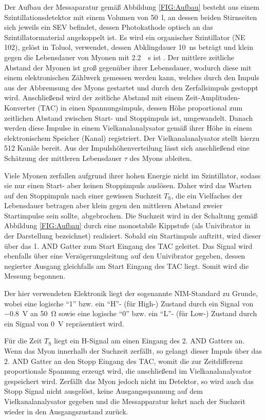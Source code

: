 Der Aufbau der Messaparatur gemäß Abbildung \ref{FIG:Aufbau} besteht aus einem Szintillationsdetektor mit einem Volumen von \SI{50}{l}, an dessen beiden Stirnseiten sich jeweils ein SEV befindet, dessen Photokathode optisch an das Szintillatormaterial angekoppelt ist. Es wird ein organischer Szintillator (NE  102), gelöst in Toluol, verwendet, dessen Abklingdauer  \SI{10}{ns} beträgt und klein gegen die Lebensdauer von Myonen mit \SI{2,2}{\micro{}s} ist \cite{PDG}. Der mittlere zeitliche Abstand der Myonen ist groß gegenüber ihrer Lebensdauer, wodurch diese mit einem elektronischen Zählwerk gemessen werden kann, welches durch den Impuls aus der Abbremsung des Myons gestartet und durch den Zerfallsimpuls gestoppt wird. Anschließend wird der zeitliche Abstand mit einem Zeit-Amplituden-Konverter (TAC) in einen Spannungsimpuls, dessen Höhe proportional zum zeitlichen Abstand zwischen Start- und Stoppimpuls ist, umgewandelt. Danach werden diese Impulse in einem Vielkanalanalysator gemäß ihrer Höhe in einem elektronischem Speicher (Kanal) registriert. Der Vielkanalanalysator stellt hierzu 512 Kanäle bereit. Aus der Impulshöhenverteilung lässt sich anschließend  eine Schätzung der mittleren Lebensdauer $\tau$ des Myons ableiten.

Viele Myonen zerfallen aufgrund ihrer hohen Energie nicht im Szintillator, sodass sie nur einen Start- aber keinen Stoppimpuls auslösen. Daher wird das Warten auf den Stopp\-impuls nach einer gewissen Suchzeit $T_{\textrm{S}}$, die ein Vielfaches der Lebensdauer betragen aber klein gegen den mittleren Abstand zweier Startimpulse sein sollte, abgebrochen. Die Suchzeit wird in der Schaltung gemäß Abbildung \ref{FIG:Aufbau} durch eine monostabile Kippstufe (als Univibrator in der Darstellung bezeichnet) realisiert. Sobald ein Startimpuls auftritt, wird dieser über das 1. AND Gatter zum Start Eingang des TAC geleitet. Das Signal wird ebenfalls über eine Verzögerungsleitung auf den Univibrator gegeben, dessen negierter Ausgang gleichfalls am Start Eingang des TAC liegt. Somit wird die Messung begonnen.

Der hier verwendeten Elektronik liegt der sogenannte NIM-Standard zu Grunde, wobei eine logische "`1"' bzw. ein "`H"'- (für High-) Zustand durch ein Signal von \SI{-0,8}{V} an \SI{50}{\ohm} sowie eine logische "`0"' bzw. ein "`L"'- (für Low-) Zustand durch ein Signal von \SI{0}{V} repräsentiert wird.

Für die Zeit $T_{\textrm{S}}$ liegt ein H-Signal am einen Eingang des 2. AND Gatters an. Wenn das Myon innerhalb der Suchzeit zerfällt, so gelangt dieser Impuls über das 2. AND Gatter an den Stopp Eingang des TAC, womit die zur Zeitdifferenz proportionale Spannung erzeugt wird, die anschließend im Vielkanalanalysator gespeichert wird. Zerfällt das Myon jedoch nicht im Detektor, so wird auch das Stopp Signal nicht ausgelöst, keine Ausgangsspannung auf dem Vielkanalanalysator gegeben und die Messapparatur kehrt nach der Suchzeit wieder in den Ausgangszustand zurück.

